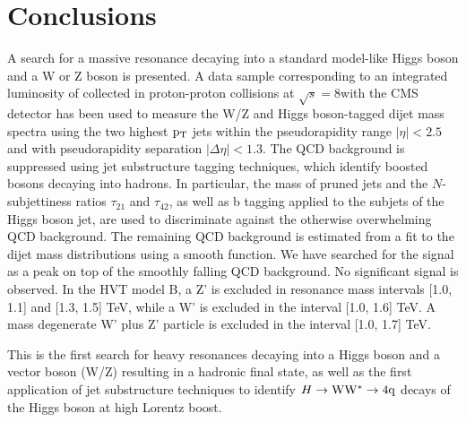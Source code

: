 \section{Conclusions}
\label{sec:conclusions}
A search for a massive resonance decaying 
into a standard model-like Higgs boson and a W or Z boson is presented.
A data sample corresponding to an integrated luminosity of \intlumi
collected in proton-proton 
collisions at $\sqrt{s}=8$\TeVcc with the CMS detector
has been used to measure the W/Z and Higgs boson-tagged 
dijet mass spectra
using the two highest $\mathrm{p_{T}}$ jets within the pseudorapidity range $|\eta| <
2.5$ and with pseudorapidity separation $|\Delta\eta| < 1.3$.  The QCD
background is suppressed using 
 jet substructure tagging techniques,
which identify boosted bosons decaying into hadrons.  In particular, 
the mass of pruned jets and the $N$-subjettiness ratios
$\tau_{21}$ and $\tau_{42}$, as well as b tagging applied to the subjets
of the Higgs boson jet, are used to discriminate
against the otherwise overwhelming QCD background.  The remaining QCD
background is estimated from a fit to the dijet mass distributions using a smooth function. 
We have searched for the signal as a peak on top of the smoothly
falling QCD background.  No significant signal is observed. 
In the HVT model B, 
a Z' is excluded in resonance mass intervals [1.0, 1.1] and 
[1.3, 1.5] TeV, while a W' is excluded in the interval [1.0, 1.6] TeV.  
A mass degenerate 
W' plus Z' particle is excluded in the interval [1.0, 1.7] TeV.  

This is the first search for heavy resonances decaying into
a Higgs boson and a vector boson (W/Z) 
resulting in a hadronic final state,
as well as the first application of jet substructure techniques
to identify 
$H\to{\rm W}{\rm W}^*\to4{\rm q}$ decays of the Higgs boson at high Lorentz boost.

